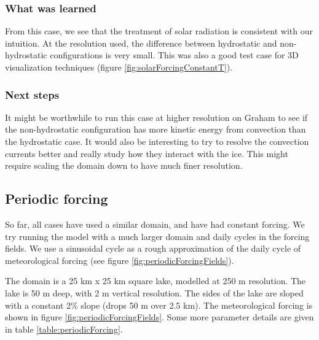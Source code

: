 \documentclass[11pt]{article}
\begin{document}
\subsubsection{What was learned}
From this case, we see that the treatment of solar radiation is consistent with our intuition. At the resolution used, the difference between hydrostatic and non-hydrostatic configurations is very small. This was also a good test case for 3D visualization techniques (figure \ref{fig:solarForcingConstantT}).

\subsubsection{Next steps}
It might be worthwhile to run this case at higher resolution on Graham to see if the non-hydrostatic configuration has more kinetic energy from convection than the hydrostatic case. It would also be interesting to try to resolve the convection currents better and really study how they interact with the ice. This might require scaling the domain down to have much finer resolution.

\subsection{Periodic forcing}
So far, all cases have used a similar domain, and have had constant forcing. We try running the model with a much larger domain and daily cycles in the forcing fields. We use a sinusoidal cycle as a rough approximation of the daily cycle of meteorological forcing (see figure \ref{fig:periodicForcingFields}).

The domain is a 25 km x 25 km square lake, modelled at 250 m resolution. The lake is 50 m deep, with 2 m vertical resolution. The sides of the lake are sloped with a constant 2\% slope (drops 50 m over 2.5 km). The meteorological forcing is shown in figure \ref{fig:periodicForcingFields}. Some more parameter details are given in table \ref{table:periodicForcing}.
\end{document}
